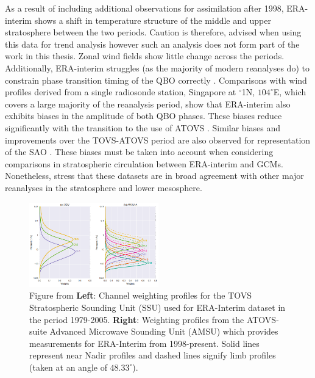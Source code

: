 As a result of including additional observations for assimilation after 1998, ERA-interim shows a shift in temperature structure of the middle and upper stratosphere between the two periods. Caution is therefore, advised when using this data for trend analysis \citep{Long2017} however such an analysis does not form part of the work in this thesis. Zonal wind fields show little change across the periods. Additionally, ERA-interim struggles (as the majority of modern reanalyses do) to constrain phase transition timing of the QBO correctly \citep{Kawatani2016}. Comparisons with wind profiles derived from a single radiosonde station, Singapore at $^{\circ}$1N, $104^{\circ}$E, which covers a large majority of the reanalysis period, show that ERA-interim also exhibits biases in the amplitude of both QBO phases. These biases reduce significantly with the transition to the use of ATOVS \citep{Kawatani2016,Long2017}. Similar biases and improvements over the TOVS-ATOVS period are also observed for representation of the SAO \cite{BaldwinGray2005}. These biases must be taken into account when considering comparisons in stratospheric circulation between ERA-interim and GCMs. Nonetheless, \cite{Long2017} stress that these datasets are in broad agreement with other major reanalyses in the stratosphere and lower mesosphere.

\begin{figure}[h!]
\centering
    \includegraphics[width=0.5\textwidth]{Figures/Figures-origins/channels.png}
    \caption[Channel profiles for satellite retrievals assimilated by ERA-Interim]{Figure from \cite{Fujiwara17} \textbf{Left}: Channel weighting profiles for the TOVS Stratospheric Sounding Unit (SSU) used for ERA-Interim dataset in the period 1979-2005. \textbf{Right}: Weighting profiles from the ATOVS-suite Advanced Microwave Sounding Unit (AMSU) which provides measurements for ERA-Interim from 1998-present. Solid lines represent near Nadir profiles and dashed lines signify limb profiles (taken at an angle of $48.33^{\circ}$).}
    \label{fig:Satellite_channels}
\centering
\end{figure}

